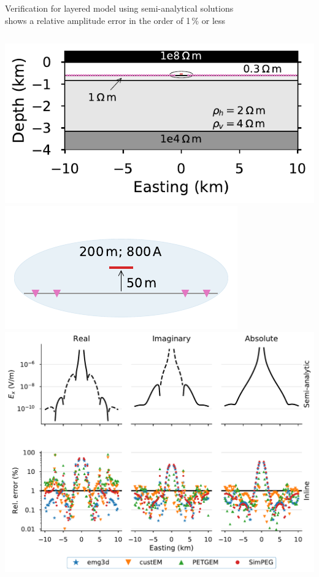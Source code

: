 \documentclass[xcolor=svgnames, aspectratio=169]{beamer}
\begin{document}
\begin{frame}[t]%
  {Verification for layered model using semi-analytical solutions\\
   shows a relative amplitude error in the order of 1\,\% or less}
  \begin{columns}[c]
      \centering
      \includegraphics[width=\textwidth]{model-layered}\\
      \hspace{1cm}\includegraphics[width=.5\textwidth]{model-layered-src}
      \includegraphics[width=\textwidth]{results-layered}

\end{columns}
\end{frame}
\end{document}
